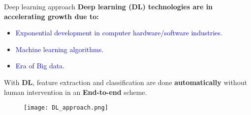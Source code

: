 \documentclass[10pt,aspectratio=169,dvipsnames]{beamer} %
\begin{document}
	\begin{frame}{Deep learning approach}
		\textbf{Deep learning (DL) technologies are in accelerating growth due to:}
		\begin{itemize}
			\item \textcolor{blue}{Exponential development in computer hardware/software industries.}
			\item \textcolor{blue}{Machine learning algorithms.}
			\item \textcolor{blue}{Era of Big data.}
		\end{itemize}	
		With \textbf{DL}, feature extraction and classification are done \alert{\textbf{automatically}} without human intervention in an \alert{\textbf{End-to-end}} scheme.
		\begin{figure}
			\texttt{[image: DL\_approach.png]}
		\end{figure}
	\end{frame}
\end{document}
